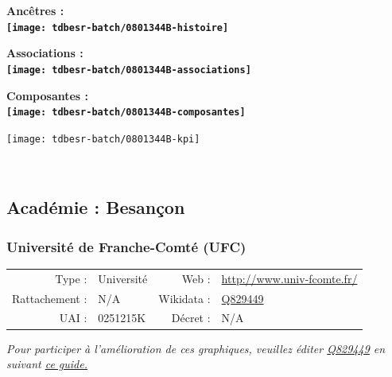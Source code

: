 \documentclass[12pt,french,]{article}
\begin{document}
\vspace{1cm}  
\begin{minipage}[b]{0.50\textwidth}\begin{center} \bf Ancêtres : \\  
\texttt{[image: tdbesr-batch/0801344B-histoire]} \end{center}\end{minipage}\begin{minipage}[b]{0.50\textwidth}\begin{center} \bf Associations : \\  
\texttt{[image: tdbesr-batch/0801344B-associations]} \end{center}\end{minipage}

\hrulefill

\begin{center} \bf Composantes : \\  
\texttt{[image: tdbesr-batch/0801344B-composantes]} \end{center}

\begin{center}\texttt{[image: tdbesr-batch/0801344B-kpi]} \end{center}\checkoddpage

\ifoddpage \fi ~\newpage  

\hypertarget{acaduxe9mie-besanuxe7on}{%
\subsection{Académie : Besançon}\label{acaduxe9mie-besanuxe7on}}

\hypertarget{universituxe9-de-franche-comtuxe9-ufc}{%
\subsubsection{Université de Franche-Comté
(UFC)}\label{universituxe9-de-franche-comtuxe9-ufc}}

\begin{tabular*}{\textwidth}{rp{5cm}rl}  
\hline  
Type : & Université & Web : &\href{http://www.univ-fcomte.fr/}{http://www.univ-fcomte.fr/} \\  
Rattachement : & N/A & Wikidata : & \href{https://www.wikidata.org/entity/Q829449}{Q829449} \\  
UAI : & 0251215K & Décret : & N/A \\  
\hline  
\end{tabular*}

\textit{\scriptsize Pour participer à l'amélioration de ces graphiques, veuillez éditer  \href{https://www.wikidata.org/entity/Q829449}{Q829449}  en suivant \href{https://github.com/cpesr/wikidataESR/blob/master/Rmd/wikidataESR.md}{ce guide.}}
\end{document}
